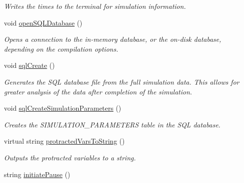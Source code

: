 \begin{DoxyCompactItemize}
\begin{DoxyCompactList}\small\item\em Writes the times to the terminal for simulation information. \end{DoxyCompactList}\item 
void \hyperlink{class_tree_a9e240bbfc3139b290a0dead741f560bf}{open\+S\+Q\+L\+Database} ()\hypertarget{class_tree_a9e240bbfc3139b290a0dead741f560bf}{}\label{class_tree_a9e240bbfc3139b290a0dead741f560bf}

\begin{DoxyCompactList}\small\item\em Opens a connection to the in-\/memory database, or the on-\/disk database, depending on the compilation options. \end{DoxyCompactList}\item 
void \hyperlink{class_tree_ae784a6ed362f6c5263ee797759f715b6}{sql\+Create} ()\hypertarget{class_tree_ae784a6ed362f6c5263ee797759f715b6}{}\label{class_tree_ae784a6ed362f6c5263ee797759f715b6}

\begin{DoxyCompactList}\small\item\em Generates the S\+QL database file from the full simulation data. This allows for greater analysis of the data after completion of the simulation. \end{DoxyCompactList}\item 
void \hyperlink{class_tree_a199f47b62b9b10917ff8b89d20c543a7}{sql\+Create\+Simulation\+Parameters} ()\hypertarget{class_tree_a199f47b62b9b10917ff8b89d20c543a7}{}\label{class_tree_a199f47b62b9b10917ff8b89d20c543a7}

\begin{DoxyCompactList}\small\item\em Creates the S\+I\+M\+U\+L\+A\+T\+I\+O\+N\+\_\+\+P\+A\+R\+A\+M\+E\+T\+E\+RS table in the S\+QL database. \end{DoxyCompactList}\item 
virtual string \hyperlink{class_tree_aa8bb5d93c7992404ede0a49bb69ccd1f}{protracted\+Vars\+To\+String} ()
\begin{DoxyCompactList}\small\item\em Outputs the protracted variables to a string. \end{DoxyCompactList}\item 
string \hyperlink{class_tree_a9b2df7fd1b61d3d70ac630f7fbfd683d}{initiate\+Pause} ()\hypertarget{class_tree_a9b2df7fd1b61d3d70ac630f7fbfd683d}{}\label{class_tree_a9b2df7fd1b61d3d70ac630f7fbfd683d}


\end{DoxyCompactItemize}
